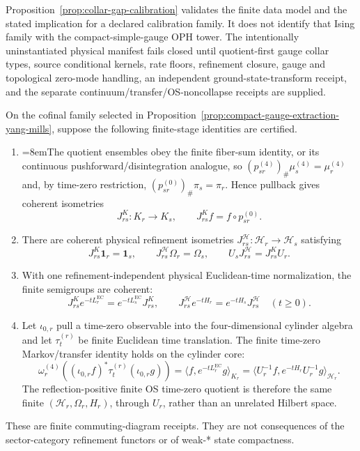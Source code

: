 \begin{remark}
Proposition~\ref{prop:collar-gap-calibration} validates the finite data model and
the stated implication for a declared calibration family.  It does not identify
that Ising family with the compact-simple-gauge OPH tower.  The intentionally
uninstantiated physical manifest fails closed until quotient-first gauge collar
types, source conditional kernels, rate floors, refinement closure, gauge and
topological zero-mode handling, an independent ground-state-transform receipt,
and the separate continuum/transfer/OS-noncollapse receipts are supplied.
\end{remark}

\begin{assumption}
\label{ass:compact-gauge-transfer-receipt}
On the cofinal family selected in
Proposition~\ref{prop:compact-gauge-extraction-yang-mills}, suppose the following finite-stage
identities are certified.
\begin{enumerate}[label=\textup{(T\arabic*)},leftmargin=2em]
\item {\emergencystretch=8em\relax The quotient ensembles obey the finite fiber-sum identity, or its continuous
pushforward/disintegration analogue, so
\((p_{sr}^{(4)})_\#\mu_s^{(4)}=\mu_r^{(4)}\) and, by time-zero restriction,
\((p_{sr}^{(0)})_\#\pi_s=\pi_r\). Hence pullback gives coherent isometries
\[
J^K_{rs}:K_r\longrightarrow K_s,
\qquad
J^K_{rs}f=f\circ p_{sr}^{(0)}.
\]\par}
\item There are coherent physical refinement isometries
\(J^{\mathcal H}_{rs}:\mathcal H_r\to\mathcal H_s\) satisfying
\[
J^K_{rs}\mathbf 1_r=\mathbf 1_s,
\qquad
J^{\mathcal H}_{rs}\Omega_r=\Omega_s,
\qquad
U_sJ^{\mathcal H}_{rs}=J^K_{rs}U_r.
\]
\item With one refinement-independent physical Euclidean-time normalization, the finite
semigroups are coherent:
\[
J^K_{rs}e^{-tL_r^{\mathrm{EC}}}
=e^{-tL_s^{\mathrm{EC}}}J^K_{rs},
\qquad
J^{\mathcal H}_{rs}e^{-tH_r}
=e^{-tH_s}J^{\mathcal H}_{rs}
\quad(t\ge0).
\]
\item Let \(\iota_{0,r}\) pull a time-zero observable into the four-dimensional cylinder algebra
and let \(\tau_t^{(r)}\) be finite Euclidean time translation. The finite time-zero
Markov/transfer identity holds on the cylinder core:
\[
\omega_r^{(4)}\!\left(
(\iota_{0,r}f)^*\tau_t^{(r)}(\iota_{0,r}g)
\right)
=\langle f,e^{-tL_r^{\mathrm{EC}}}g\rangle_{K_r}
=\langle U_r^{-1}f,e^{-tH_r}U_r^{-1}g\rangle_{\mathcal H_r}.
\]
The reflection-positive finite OS time-zero quotient is therefore the same finite
\((\mathcal H_r,\Omega_r,H_r)\), through \(U_r\), rather than an unrelated Hilbert space.
\end{enumerate}
These are finite commuting-diagram receipts. They are not consequences of the sector-category
refinement functors or of weak-* state compactness.
\end{assumption}

